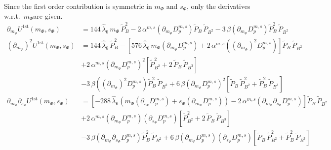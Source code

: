 Since the first order contribution is symmetric in $m_{\Phi}$ and $s_{\Phi}$, only the derivatives w.r.t.\ $m_{\Phi}$are given. 
\begin{align}\label{eq:CEP_derivative_dm_firstOrder}
 \partial_{m_{\Phi}} U^{\text{1st}}(m_{\Phi}, s_{\Phi}) & = 144\,\hat\lambda_6\, m_{\Phi}\, \tilde P_B^2 
                         - 2\,\alpha^{m,s}\left( \partial_{m_{\Phi}} D_p^{m,s} \right) \tilde P_B\, \tilde P_{B^2}
                         - 3\, \beta \left( \partial_{m_{\Phi}} D_p^{m,s} \right) \tilde P_B^2\,  \tilde P_{B^2}
       \\ \label{eq:CEP_derivative_dmdm_firstOrder}
 \left(\partial_{m_{\Phi}}\right)^2 U^{\text{1st}}(m_{\Phi}, s_{\Phi}) & = 144\,\hat\lambda_6\, \tilde P_B^2 -
                         \left[ 576\,\hat\lambda_6\,m_{\Phi}\left( \partial_{m_{\Phi}} D_p^{m,s} \right) 
                         + 2\,\alpha^{m,s}\left( \left(\partial_{m_{\Phi}}\right)^2 D_p^{m,s} \right) \right] \tilde P_B\, \tilde P_{B^2}
       \nonumber \\
                       & + 2\,\alpha^{m,s}\left( \partial_{m_{\Phi}} D_p^{m,s} \right)^2 \left[ \tilde P_{B^2}^2 + 2\, \tilde P_B\, \tilde P_{B^3} \right]
       \nonumber \\
                       & - 3\, \beta \left( \left(\partial_{m_{\Phi}}\right)^2 D_p^{m,s} \right) \tilde P_B^2\,  \tilde P_{B^2}
                         + 6\, \beta \left( \partial_{m_{\Phi}} D_p^{m,s} \right)^2 
                         \left[ \tilde P_B\,  \tilde P_{B^2}^2 + \tilde P_B^2\,  \tilde P_{B^3} \right]
      \\ \label{eq:CEP_derivative_dmds_firstOrder}
 \partial_{m_{\Phi}}\partial_{s_{\Phi}}U^{\text{1st}}(m_{\Phi}, s_{\Phi}) & =
                         \left[- 288\,\hat\lambda_6\left( m_{\Phi} \left( \partial_{s_{\Phi}} D_p^{m,s} \right) + s_{\Phi} \left( \partial_{m_{\Phi}} D_p^{m,s} \right) \right)
                         - 2\,\alpha^{m,s} \left( \partial_{m_{\Phi}} \partial_{s_{\Phi}} D_p^{m,s} \right) \right] \tilde P_B\, \tilde P_{B^2}
      \nonumber \\
                       & + 2\,\alpha^{m,s} \left( \partial_{m_{\Phi}} D_p^{m,s} \right)\left( \partial_{s_{\Phi}} D_p^{m,s} \right)
                         \left[ \tilde P_{B^2}^2 + 2\, \tilde P_B\, \tilde P_{B^3} \right]
      \nonumber \\
                       & - 3\, \beta \left( \partial_{m_{\Phi}}\partial_{s_{\Phi}} D_p^{m,s} \right) \tilde P_B^2\,  \tilde P_{B^2}
                         + 6\, \beta \left( \partial_{m_{\Phi}} D_p^{m,s} \right)\left( \partial_{s_{\Phi}} D_p^{m,s} \right)
                         \left[ \tilde P_B\,  \tilde P_{B^2}^2 + \tilde P_B^2\,  \tilde P_{B^3} \right]
\end{align}




